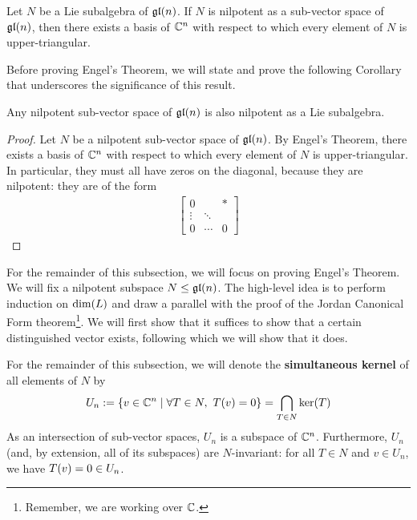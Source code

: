 \begin{boxtheorem}\label{Ch1:Thm:Engel}
    Let $N$ be a Lie subalgebra of $\mathfrak{gl}\!\left( n \right)$. If $N$ is nilpotent as a sub-vector space of $\mathfrak{gl}\!\left( n \right)$, then there exists a basis of $\mathbb{C}^n$ with respect to which every element of $N$ is upper-triangular.
\end{boxtheorem}

Before proving Engel's Theorem, we will state and prove the following Corollary that underscores the significance of this result.

\begin{boxcorollary}\label{Ch1:Cor:EngelNilpotency}
    Any nilpotent sub-vector space of $\mathfrak{gl}\!\left( n \right)$ is also nilpotent as a Lie subalgebra.
\end{boxcorollary}
\begin{proof}
    Let $N$ be a nilpotent sub-vector space of $\mathfrak{gl}\!\left( n \right)$. By Engel's Theorem, there exists a basis of $\mathbb{C}^n$ with respect to which every element of $N$ is upper-triangular. In particular, they must all have zeros on the diagonal, because they are nilpotent: they are of the form
    \begin{align*}
        \begin{bmatrix}
            0 & & * \\
            \vdots & \ddots & \\
            0 & \cdots & 0
        \end{bmatrix}
    \end{align*}
    \sorry
\end{proof}

For the remainder of this subsection, we will focus on proving Engel's Theorem. We will fix a nilpotent subspace $N \leq \mathfrak{gl}\!\left( n \right)$. The high-level idea is to perform induction on $\dim\!\left( L \right)$ and draw a parallel with the proof of the Jordan Canonical Form theorem\footnote{Remember, we are working over $\mathbb{C}$.}. We will first show that it suffices to show that a certain distinguished vector exists, following which we will show that it does.

For the remainder of this subsection, we will denote the \textbf{simultaneous kernel} of all elements of $N$ by
\begin{align}
    U_n := \left\{ v \in \mathbb{C}^n \; \middle\vert \; \forall T \in N, \ T\!\left( v \right) = 0 \right\} = \bigcap_{T \in N} \operatorname{ker}\!\left( T \right)
    \label{Ch1:Eq:Simultaneous_Kernel_Def}
\end{align}
As an intersection of sub-vector spaces, $U_n$ is a subspace of $\mathbb{C}^n$. Furthermore, $U_n$ (and, by extension, all of its subspaces) are $N$-invariant: for all $T \in N$ and $v \in U_n$, we have $T\!\left( v \right) = 0 \in U_n$.

